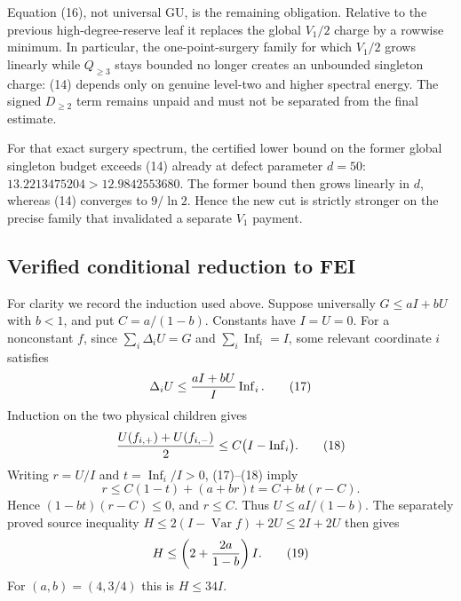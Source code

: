 Equation (16), not universal GU, is the remaining obligation.  Relative to
the previous high-degree-reserve leaf it replaces the global $V_1/2$ charge
by a rowwise minimum.  In particular, the one-point-surgery family for
which $V_1/2$ grows linearly while $Q_{\ge3}$ stays bounded no longer creates
an unbounded singleton charge: (14) depends only on genuine level-two and
higher spectral energy.  The signed $D_{\ge2}$ term remains unpaid and must
not be separated from the final estimate.

For that exact surgery spectrum, the certified lower bound on the former
global singleton budget exceeds (14) already at defect parameter $d=50$:
$13.2213475204>12.9842553680$.  The former bound then grows linearly in
$d$, whereas (14) converges to $9/\ln2$.  Hence the new cut is strictly
stronger on the precise family that invalidated a separate $V_1$ payment.

\subsection*{Verified conditional reduction to FEI}

For clarity we record the induction used above.  Suppose universally
$G\le aI+bU$ with $b<1$, and put $C=a/(1-b)$.  Constants have
$I=U=0$.  For a nonconstant $f$, since
$\sum_i\Delta_iU=G$ and $\sum_i\operatorname{Inf}_i=I$, some relevant
coordinate $i$ satisfies
\[
 \Delta_iU\le {aI+bU\over I}\operatorname{Inf}_i.                \tag{17}
\]
Induction on the two physical children gives
\[
 {U(f_{i,+})+U(f_{i,-})\over2}
 \le C\bigl(I-\operatorname{Inf}_i\bigr).                        \tag{18}
\]
Writing $r=U/I$ and $t=\operatorname{Inf}_i/I>0$, (17)--(18) imply
\[
 r\le C(1-t)+(a+br)t=C+bt(r-C).
\]
Hence $(1-bt)(r-C)\le0$, and $r\le C$.  Thus $U\le aI/(1-b)$.
The separately proved source inequality
$H\le2(I-\operatorname{Var}f)+2U\le2I+2U$ then gives
\[
 H\le\left(2+{2a\over1-b}\right)I.                              \tag{19}
\]
For $(a,b)=(4,3/4)$ this is $H\le34I$.
